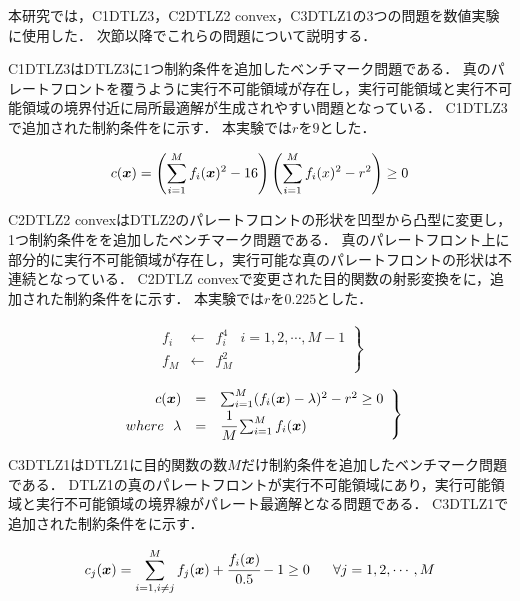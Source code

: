 \documentclass[../main/main]{subfiles}
\begin{document}
本研究では，C1DTLZ3，C2DTLZ2 convex，C3DTLZ1の3つの問題を数値実験に使用した．
次節以降でこれらの問題について説明する．

C1DTLZ3はDTLZ3に1つ制約条件を追加したベンチマーク問題である．
真のパレートフロントを覆うように実行不可能領域が存在し，実行可能領域と実行不可能領域の境界付近に局所最適解が生成されやすい問題となっている．
C1DTLZ3で追加された制約条件をに示す．
本実験では$r$を$9$とした．

\begin{equation}
\centering
c(\bm{x}) = \left( \sum^M_{i=1} f_i (\bm{x})^2 - 16 \right) \left( \sum^M_{i=1} f_i(x)^2 - r^2 \right) \geq 0
\label{c1dtlz3_const}
\end{equation}


C2DTLZ2 convexはDTLZ2のパレートフロントの形状を凹型から凸型に変更し，1つ制約条件をを追加したベンチマーク問題である．
真のパレートフロント上に部分的に実行不可能領域が存在し，実行可能な真のパレートフロントの形状は不連続となっている．
C2DTLZ convexで変更された目的関数の射影変換をに，追加された制約条件をに示す．
本実験では$r$を$0.225$とした．

\begin{eqnarray}
\left.
\begin{array}{rcl}
f_i &\longleftarrow& f^4_i \ \ \ \ i = 1, 2, \cdots, M-1\\
f_M &\longleftarrow& f^2_M
\end{array}
\right\}
\label{c2dtlz2_changed}
\end{eqnarray}

\begin{eqnarray}
\left.
\begin{array}{rcl}
c(\bm{x}) &=& \sum^M_{i=1} (f_i(\bm{x}) - \lambda)^2 - r^2 \geq 0\\
where \ \ \lambda &=& \cfrac{1}{M} \sum^M_{i=1} f_i(\bm{x})\\
\end{array}
\right\}
\label{c2dtlz2_const}
\end{eqnarray}

C3DTLZ1はDTLZ1に目的関数の数$M$だけ制約条件を追加したベンチマーク問題である．
DTLZ1の真のパレートフロントが実行不可能領域にあり，実行可能領域と実行不可能領域の境界線がパレート最適解となる問題である．
C3DTLZ1で追加された制約条件をに示す．

\begin{equation}
c_j(\bm{x}) = \sum^M_{i = 1, i \neq j} f_j(\bm{x}) + \cfrac{f_i(\bm x)}{0.5} - 1 \geq 0 \ \ \ \ \ \forall j = 1, 2, \cdots, M
\label{c3dtlz1_const}
\end{equation}
\end{document}
